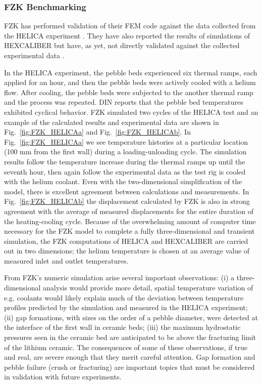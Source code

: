 \subsubsection{FZK Benchmarking}
FZK has performed validation of their FEM code against the data collected from the HELICA experiment \cite{Gan:2008kx}. They have also reported the results of simulations of HEXCALIBER but have, as yet, not directly validated against the collected experimental data \cite{Gan:2009vn}.

In the HELICA experiment, the pebble beds experienced six thermal ramps, each applied for an hour, and then the pebble beds were actively cooled with a helium flow. After cooling, the pebble beds were subjected to the another thermal ramp and the process was repeated. DIN reports\cite{dellorco:2006} that the pebble bed temperatures exhibited cyclical behavior. FZK simulated two cycles of the HELICA test and an example of the calculated results and experimental data are shown in Fig.~\ref{fig:FZK_HELICAa} and Fig.~\ref{fig:FZK_HELICAb}. In Fig.~\ref{fig:FZK_HELICAa} we see temperature histories at a particular location (100 mm from the first wall) during a loading-unloading cycle. The simulation results follow the temperature increase during the thermal ramps up until the seventh hour, then again follow the experimental data as the test rig is cooled with the helium coolant. Even with the two-dimensional simplification of the model, there is excellent agreement between calculations and measurements. In Fig.~\ref{fig:FZK_HELICAb} the displacement calculated by FZK is also in strong agreement with the average of measured displacements for the entire duration of the heating-cooling cycle. Because of the overwhelming amount of computer time necessary for the FZK model to complete a fully three-dimensional and transient simulation, the FZK computations of HELICA and HEXCALIBER are carried out in two dimensions; the helium temperature is chosen at an average value of measured inlet and outlet temperatures.

From FZK's numeric simulation arise several important observations: (i) a three-dimensional analysis would provide more detail, spatial temperature variation of e.g. coolants would likely explain much of the deviation between temperature profiles predicted by the simulation and measured in the HELICA experiment; (ii) gap formations, with sizes on the order of a pebble diameter, were detected at the interface of the first wall in ceramic beds; (iii) the maximum hydrostatic pressures seen in the ceramic bed are anticipated to be above the fracturing limit of the lithium ceramic. The consequences of some of these observations, if true and real, are severe enough that they merit careful attention. Gap formation and pebble failure (crush or fracturing) are important topics that must be considered in validation with future experiments.

